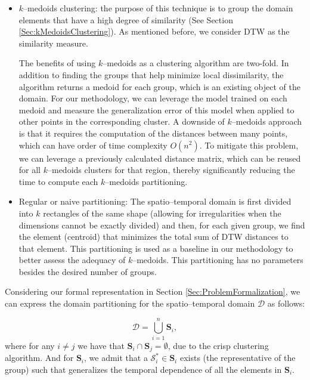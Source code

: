 \begin{itemize}%
	\item $k$--medoids clustering: the purpose of this technique is to group the domain elements that have a high degree of similarity (See Section \ref{Sec:kMedoidsClustering}). As mentioned before, we consider DTW as the similarity measure. 
	
	The benefits of using $k$--medoids as a clustering algorithm are two-fold. In addition to finding the groups that help minimize local dissimilarity, the algorithm returns a medoid for each group, which is an existing object of the domain. For our methodology, we can leverage the model trained on each medoid and measure the generalization error of this model when applied to other points in the corresponding cluster. A downside of $k$--medoids approach is that it requires the computation of the distances between many points, which can have order of time complexity $O(n^2)$. To mitigate this problem, we can leverage a previously calculated distance matrix, which can be reused for all $k$--medoids clusters for that region, thereby significantly reducing the time to compute each $k$--medoids partitioning.
	
	\item Regular or naive partitioning: The spatio--temporal domain is first divided into $k$ rectangles of the same shape (allowing for irregularities when the dimensions cannot be exactly divided) and then, for each given group, we find the element (centroid) that minimizes the total sum of DTW distances to that element. This partitioning is used as a baseline in our methodology to better assess the adequacy of $k$--medoids. This partitioning has no parameters besides the desired number of groups.
\end{itemize}

Considering our formal representation in Section \ref{Sec:ProblemFormalization}, we can express the domain partitioning for the spatio--temporal domain $\mathcal{D}$ as follows:

\begin{equation}
\mathcal{D} = \bigcup_{i=1}^{n} \mathbf{S}_{i},
\end{equation}
where for any $i\neq j$ we have that $\mathbf{S}_{i} \cap \mathbf{S}_{j} = \emptyset$, due to the crisp clustering algorithm. And for $\mathbf{S}_{i}$, we admit that a $\mathcal{S}_{i}^{*} \in \mathbf{S}_{i}$ exists (the representative of the group) such that generalizes the temporal dependence of all the elements in $\mathbf{S}_{i}$.


